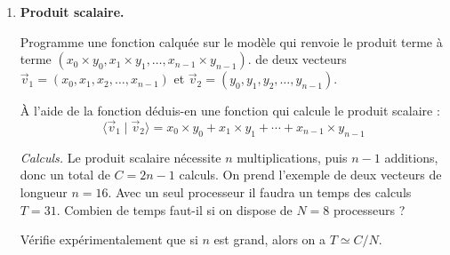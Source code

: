\documentclass[11pt,class=report,crop=false]{standalone}
\begin{document}
\begin{activite}
\begin{enumerate}
\begin{algorithme}
\begin{itemize}
\begin{itemize}
    \item Renvoyer la somme $S=S_g + S_d$. 
    
  \end{itemize}   
   
\end{itemize}  
\end{algorithme}

\bigskip
Programme cet algorithme en une fonction .

\emph{Zombies.} C'est cette méthode qui s'apparente le plus à la distribution efficace de nos pilules pour contrer les zombies.

\emph{Plus difficile.} Dans un second temps, modifie ta fonction afin qu'elle renvoie aussi le nombre de calculs et le temps des calculs nécessaires (en supposant qu'il y a suffisamment de processeurs).


  \item \textbf{Produit scalaire.} 
  
  Programme une fonction  calquée sur le modèle  qui renvoie le produit terme à terme  $(x_0 \times y_0,x_1 \times y_1,\ldots,x_{n-1} \times y_{n-1})$. 
  de deux vecteurs $\vec v_1 = (x_0,x_1,x_2,\ldots,x_{n-1})$ et 
    $\vec v_2 = (y_0,y_1,y_2,\ldots,y_{n-1})$.
    
    \`A l'aide de la fonction  déduis-en une fonction 
     qui calcule le produit scalaire :
    $$\langle\vec v_1 \mid \vec v_2\rangle = x_0 \times y_0  + x_1 \times y_1 + \cdots  + x_{n-1} \times y_{n-1}$$
    
    \emph{Calculs.} Le produit scalaire nécessite $n$ multiplications, puis $n-1$ additions, donc un total de $C = 2n-1$ calculs.    
    On prend l'exemple de deux vecteurs de longueur $n=16$. Avec un seul processeur il faudra un temps des calculs $T =31$.
    Combien de temps faut-il si on dispose de $N=8$ processeurs ?
    
    Vérifie expérimentalement que si $n$ est grand, alors on a $T \simeq C/N$.
    
\end{enumerate}
   
\end{activite}





\end{document}
